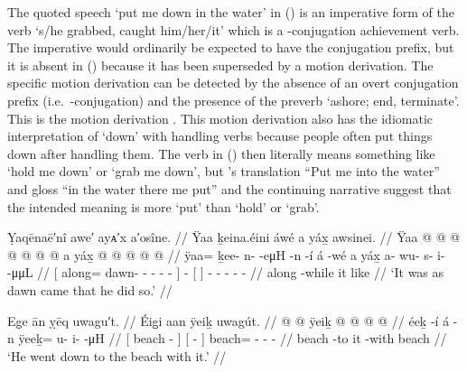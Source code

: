 The quoted speech  ‘put me down in the water’ in (\lastx) is an imperative form of the verb  ‘s/he grabbed, caught him/her/it’ which is a -conjugation achievement verb.
The imperative would ordinarily be expected to have the  conjugation prefix, but it is absent in (\lastx) because it has been superseded by a motion derivation.
The specific motion derivation can be detected by the absence of an overt conjugation prefix (i.e.\ -conjugation) and the presence of the preverb  ‘ashore; end, terminate’.
This is the motion derivation .
This motion derivation also has the idiomatic interpretation of ‘down’ with handling verbs because people often put things down after handling them.
The verb in (\lastx) then literally means something like ‘hold me down’ or ‘grab me down’, but \citeauthor{swanton:1909}’s translation “Put me into the water” and gloss “in the water there me put” and the continuing narrative suggest that the intended meaning is more ‘put’ than ‘hold’ or ‘grab’.

\ex\label{ex:90-28-dawning-did-so}%
%
\begingl
	\glpreamble	Ỵaqēnaē′nî awe′ ayᴀ′x a′osîne. //
	\glpreamble	Ÿaa ḵeina.éini áwé a yáx̱ awsinei. //
	\gla	{} Ÿaa @  @ {} @ {} @ {} @ {} @ {} {}
		 @ {}
		{} a yáx̱ {}
		 @ {} @ {} @ {} @ {} @ {} //
	\glb	{} ÿaa= ḵee- n-  -eμH -n -í {}
		á -wé
		{} a yáx̱ {}
		a- wu- s- i-  -μμL //
	\glc	{}[ along= dawn- -  - - - {}]
		 -
		{}[   {}]
		- - - -  - //
	\gld	{} along  {} {} {} {} -while {}
		 {}
		{} it like {}
		 {} {} {} {} {} //
	\glft	‘It was as dawn came that he did so.’
		//
\endgl
\xe

\ex\label{ex:90-29-down-to-beach}%
%
\begingl
	\glpreamble	Eg̣e ān ỵēq uwagu′t. //
	\glpreamble	Éig̱i aan ÿeiḵ uwagút. //
	\gla	{}  @ {} {}
		{}  @ {} {}
		ÿeiḵ @  @ {} @ {} @ {} //
	\glb	{} éeḵ -í {}
		{} á -n {}
		ÿeeḵ= u- i-  -μH //
	\glc	{}[ beach - {}]
		{}[  - {}]
		beach= - -  - //
	\gld	{} beach -to {}
		{} it -with {}
		beach  {} {} {} //
	\glft	‘He went down to the beach with it.’
		//
\endgl
\xe

